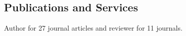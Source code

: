 \documentclass[centered,11pt,overlapped]{res}
\begin{document}
\begin{resume}
{%
\section{\sc Publications and Services}
Author for 27 journal articles and reviewer for 11 journals.
}


\end{resume}
\end{document}
